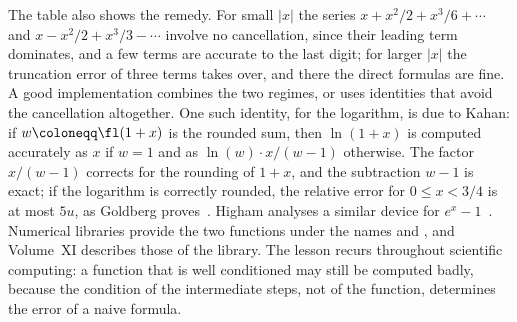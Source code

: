 \begin{table}
\end{table}

The table also shows the remedy. For small $|x|$ the series $x+x^2/2+x^3/6+\cdots$ and $x-x^2/2+x^3/3-\cdots$ involve no cancellation, since their leading term dominates, and a few terms are accurate to the last digit; for larger $|x|$ the truncation error of three terms takes over, and there the direct formulas are fine. A good implementation combines the two regimes, or uses identities that avoid the cancellation altogether. One such identity, for the logarithm, is due to Kahan: if $w\coloneqq\fl(1+x)$ is the rounded sum, then $\ln(1+x)$ is computed accurately as $x$ if $w=1$ and as $\ln(w)\cdot x/(w-1)$ otherwise. The factor $x/(w-1)$ corrects for the rounding of $1+x$, and the subtraction $w-1$ is exact; if the logarithm is correctly rounded, the relative error for $0\le x<3/4$ is at most $5u$, as Goldberg proves~\cite[Theorem~4]{goldberg1991}. Higham analyses a similar device for $e^x-1$~\cite[Sect.~1.14.1]{higham2002accuracy}. Numerical libraries provide the two functions under the names  and , and Volume~XI describes those of the library. The lesson recurs throughout scientific computing: a function that is well conditioned may still be computed badly, because the condition of the intermediate steps, not of the function, determines the error of a naive formula.

